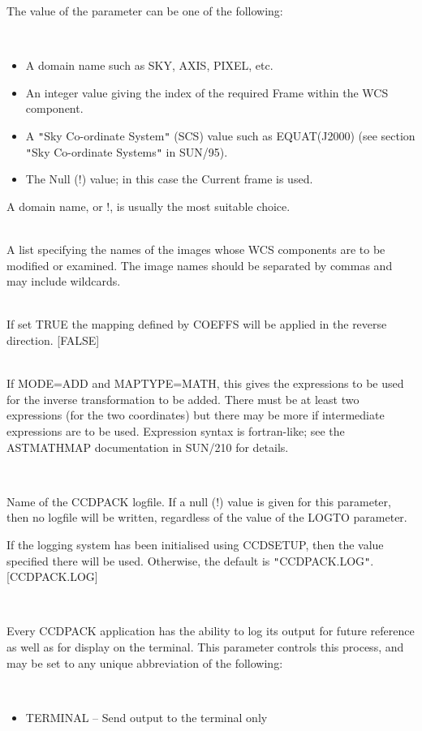 \documentclass[twoside,11pt]{article}
\newcommand{\htmlref}[2]{#1}
\newcommand{\xref}[3]{#1}
\renewcommand{\_}{\texttt{\symbol{95}}}
\newcommand{\qt}[1]{{\tt "}#1{\tt "}}
\newcommand{\xroutine}[1]{\htmlref{{\sc #1}}{#1}}
\newcommand{\sstsubsection}[1]{ \item[{#1}] \mbox{} \\}
\newcommand{\sstitemlist}[1]{
  \mbox{} \\
  \vspace{-3.5ex}
  \begin{itemize}
     #1
  \end{itemize}
}
\newcommand{\sstitem}{\item}
\newcommand{\sstsubsection}[1]{\item[{#1}]}
\newcommand{\sstitemlist}[1]{
      \begin{itemize}
         #1
      \end{itemize}
      \\
   }
\newcommand{\sstitem}{\item}
\begin{document}
{{{         The value of the parameter can be one of the following:
         \sstitemlist{
            \sstitem
               A domain name such as SKY, AXIS, PIXEL, etc.
            \sstitem
               An integer value giving the index of the required Frame
               within the WCS component.
            \sstitem
               A \qt{Sky Co-ordinate System} (SCS) value such as
               EQUAT(J2000)
               (see section
               \xref{\qt{Sky Co-ordinate Systems}}{sun95}{se_scs} in
               SUN/95).
            \sstitem
               The Null (!) value; in this case the Current frame is used.
         }
         A domain name, or !, is usually the most suitable choice.
      }
      \sstsubsection{
         IN = LITERAL (Read)
      } {
         A list specifying the names of the images whose WCS components
         are to be modified or examined.  The image names should be separated by
         commas and may include wildcards.
      }
      \sstsubsection{
         INVERT = \_LOGICAL (Read)
      } {
         If set TRUE the mapping defined by COEFFS will be applied in
         the reverse direction.
         [FALSE]
      }
      \sstsubsection{
         INVEXP $*$ ( $*$ ) = LITERAL (Read)
      }{
         If MODE=ADD and MAPTYPE=MATH, this gives the expressions to
         be used for the inverse transformation to be added.  There
         must be at least two expressions (for the two coordinates)
         but there may be more if intermediate expressions are to
         be used.  Expression syntax is fortran-like; see the
         AST\_MATHMAP documentation in SUN/210 for details.
      }
      \sstsubsection{
         LOGFILE = FILENAME (Read)
      } {
         Name of the CCDPACK logfile.  If a null (!) value is given for
         this parameter, then no logfile will be written, regardless of
         the value of the LOGTO parameter.

         If the logging system has been initialised using \xroutine{CCDSETUP},
         then the value specified there will be used. Otherwise, the
         default is \qt{CCDPACK.LOG}.
         [CCDPACK.LOG]
      }
      \sstsubsection{
         LOGTO = LITERAL (Read)
      } {
         Every CCDPACK application has the ability to log its output
         for future reference as well as for display on the terminal.
         This parameter controls this process, and may be set to any
         unique abbreviation of the following:
         \sstitemlist{

            \sstitem
               TERMINAL  -- Send output to the terminal only

}}}}
\end{document}
